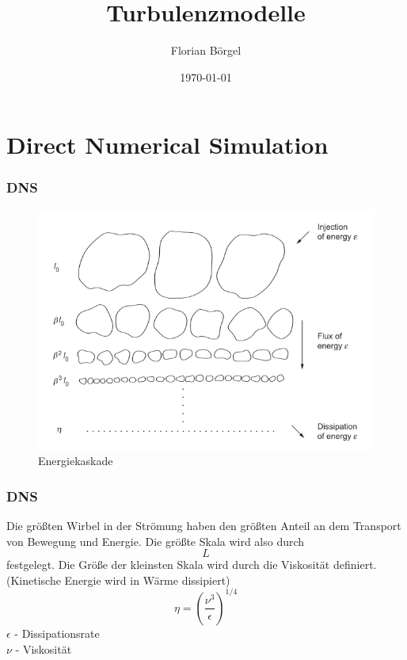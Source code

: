 \documentclass[11pt,t]{beamer}
\title[Theoretische Ozeanographie]{Turbulenzmodelle}
\author[Florian Börgel]{Florian Börgel}
\date{\today}
\institute{Universität Oldenburg}
\begin{document}
\frame{\titlepage}

\section{Direct Numerical Simulation}
\begin{frame}
\frametitle{DNS}
\begin{figure}
\includegraphics[width=0.8\linewidth]{images/cascade.png}
\caption{Energiekaskade}
\end{figure}
\end{frame}

\begin{frame}
	\frametitle{DNS}
Die größten Wirbel in der Strömung haben den größten Anteil an dem Transport von Bewegung und Energie. Die größte Skala wird also durch 
\begin{equation}
L
\end{equation}
festgelegt. Die Größe der kleinsten Skala wird durch die Viskosität definiert. (Kinetische Energie wird in Wärme dissipiert)
\begin{equation}
\eta = (\frac{\nu^3}{\epsilon})^{1/4}
\end{equation}
\hspace{1cm}$\epsilon$ - Dissipationsrate\\
\hspace{1cm}$\nu$ - Viskosität
\end{frame}
\end{document}
